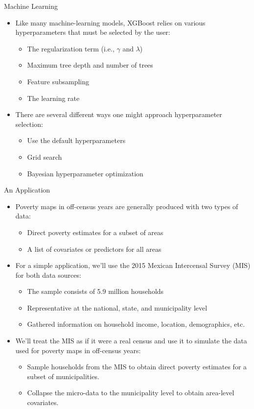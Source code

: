 \documentclass[aspectratio=169, xcolor=dvipsnames]{beamer}
\begin{document}
\begin{frame}{Machine Learning}
\begin{itemize}
\item Like many machine-learning models, XGBoost relies on various 
hyperparameters that must be selected by the user:
\begin{itemize}
\item The regularization term (i.e., $\gamma$ and $\lambda$)
\item Maximum tree depth and number of trees
\item Feature subsampling
\item The learning rate
\end{itemize}
\item There are several different ways one might approach hyperparameter selection:
\begin{itemize}
\item Use the default hyperparameters
\item Grid search
\item Bayesian hyperparameter optimization
\end{itemize}
\end{itemize}
\end{frame}

\begin{frame}{An Application}
\begin{itemize}
\item Poverty maps in off-census years are generally produced with two types
of data:
\begin{itemize}
\item Direct poverty estimates for a subset of areas
\item A list of covariates or predictors for all areas
\end{itemize}
\item For a simple application, we'll use the 2015 Mexican Intercensal Survey (MIS)
for both data sources:
\begin{itemize}
\item The sample consists of 5.9 million households
\item Representative at the national, state, and municipality level
\item Gathered information on household income, location, demographics, etc.
\end{itemize}
\item We'll treat the MIS as if it were a real census and use it to simulate the
data used for poverty maps in off-census years:
\begin{itemize}
\item Sample households from the MIS to obtain direct poverty estimates for a 
subset of municipalities.
\item Collapse the micro-data to the municipality level to obtain area-level covariates.
\end{itemize}
\end{itemize}
\end{frame}
\end{document}

